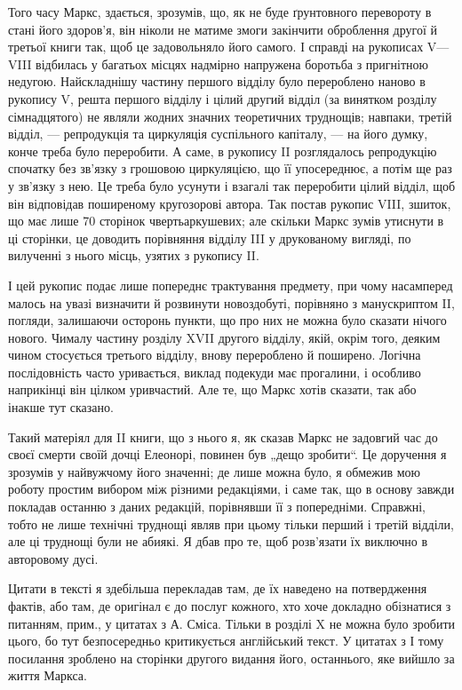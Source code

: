 Того часу Маркс, здається, зрозумів, що, як не буде ґрунтовного перевороту
в стані його здоров’я, він ніколи не матиме змоги закінчити оброблення
другої й третьої книги так, щоб це задовольняло його самого. І справді
на рукописах V—VIII відбилась у багатьох місцях надмірно напружена
боротьба з пригнітною недугою. Найскладнішу частину першого відділу
було перероблено наново в рукопису V, решта першого відділу і цілий
другий відділ (за винятком розділу сімнадцятого) не являли жодних
значних теоретичних труднощів; навпаки, третій відділ, — репродукція
та циркуляція суспільного капіталу, — на його думку, конче треба
було переробити. А саме, в рукопису II розглядалось репродукцію
спочатку без зв’язку з грошовою циркуляцією, що її упосереднює, а потім
ще раз у зв’язку з нею. Це треба було усунути і взагалі так переробити
цілий відділ, щоб він відповідав поширеному кругозорові автора.
Так постав рукопис VIII, зшиток, що має лише 70 сторінок чвертьаркушевих;
але скільки Маркс зумів утиснути в ці сторінки, це доводить
порівняння відділу III у друкованому вигляді, по вилученні з нього
місць, узятих з рукопису II.

І цей рукопис подає лише попереднє трактування предмету, при чому
насамперед малось на увазі визначити й розвинути новоздобуті, порівняно
з манускриптом II, погляди, залишаючи осторонь пункти, що про них
не можна було сказати нічого нового. Чималу частину розділу XVII
другого відділу, якій, окрім того, деяким чином стосується третього відділу,
внову перероблено й поширено. Логічна послідовність часто уривається,
виклад подекуди має прогалини, і особливо наприкінці він цілком
уривчастий. Але те, що Маркс хотів сказати, так або інакше тут сказано.

Такий матеріял для II книги, що з нього я, як сказав Маркс не задовгий
час до своєї смерти своїй дочці Елеонорі, повинен був „дещо зробити“.
Це доручення я зрозумів у найвужчому його значенні; де лише
можна було, я обмежив мою роботу простим вибором між різними редакціями,
і саме так, що в основу завжди покладав останню з даних редакцій,
порівнявши її з попередніми. Справжні, тобто не лише технічні
труднощі являв при цьому тільки перший і третій відділи, але ці труднощі
були не абиякі. Я дбав про те, щоб розв’язати їх виключно в
авторовому дусі.

Цитати в тексті я здебільша перекладав там, де їх наведено на потвердження
фактів, або там, де оригінал є до послуг кожного, хто хоче
докладно обізнатися з питанням, прим., у цитатах з А. Сміса. Тільки в
розділі X не можна було зробити цього, бо тут безпосередньо критикується
англійський текст. У цитатах з І тому посилання зроблено на
сторінки другого видання його, останнього, яке вийшло за життя
Маркса.

